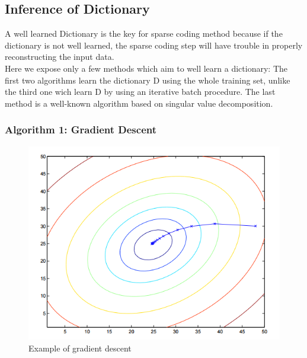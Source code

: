 
\subsection{Inference of Dictionary}
A well learned Dictionary is the key for sparse coding method because if the dictionary is not well learned, the sparse coding step will have trouble in properly reconstructing the input data.\\
Here we expose only a few methods which aim to well learn a dictionary: The first two algorithms learn the dictionary D using the whole training set, unlike the third one wich learn D by using an iterative batch procedure. The last method is a well-known algorithm based on singular value decomposition.

\subsubsection{Algorithm 1: Gradient Descent }

\begin{figure}[h]
 \centering
 \includegraphics[scale=0.3]{ellipses.png}
 \caption{Example of gradient descent}
 \label{fig:gradientDescent}
\end{figure}


